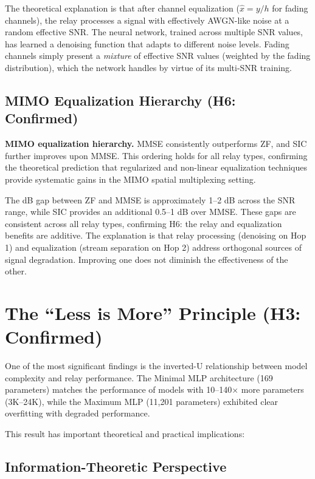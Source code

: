 The theoretical explanation is that after channel equalization (\(\hat{x} = y/h\) for fading channels), the relay processes a signal with effectively AWGN-like noise at a random effective SNR. The neural network, trained across multiple SNR values, has learned a denoising function that adapts to different noise levels. Fading channels simply present a \emph{mixture} of effective SNR values (weighted by the fading distribution), which the network handles by virtue of its multi-SNR training.

\subsection{MIMO Equalization Hierarchy (H6: Confirmed)}\label{sec:mimo-equalization-hierarchy-h6-confirmed}

\textbf{MIMO equalization hierarchy.} MMSE consistently outperforms ZF, and SIC further improves upon MMSE. This ordering holds for all relay types, confirming the theoretical prediction that regularized and non-linear equalization techniques provide systematic gains in the MIMO spatial multiplexing setting.

The dB gap between ZF and MMSE is approximately 1--2 dB across the SNR range, while SIC provides an additional 0.5--1 dB over MMSE. These gaps are consistent across all relay types, confirming H6: the relay and equalization benefits are additive. The explanation is that relay processing (denoising on Hop 1) and equalization (stream separation on Hop 2) address orthogonal sources of signal degradation. Improving one does not diminish the effectiveness of the other.

\section{The ``Less is More'' Principle (H3: Confirmed)}\label{sec:the-less-is-more-principle-h3-confirmed}

One of the most significant findings is the inverted-U relationship between model complexity and relay performance. The Minimal MLP architecture (169 parameters) matches the performance of models with 10--140× more parameters (3K--24K), while the Maximum MLP (11,201 parameters) exhibited clear overfitting with degraded performance.

This result has important theoretical and practical implications:

\subsection{Information-Theoretic Perspective}\label{sec:information-theoretic-perspective}

